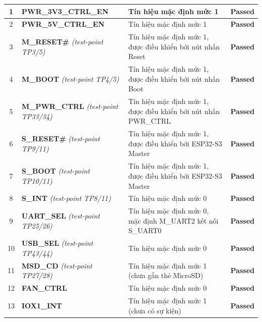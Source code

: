 \begin{longtable}{|c|p{}|p{}|c|}
                    1 & \textbf{PWR\_3V3\_CTRL\_EN} & Tín hiệu mặc định mức 1 & \textcolor{modern_blue}{\textbf{Passed}} \\ \hline
                    2 & \textbf{PWR\_5V\_CTRL\_EN} & Tín hiệu mặc định mức 1 & \textcolor{modern_blue}{\textbf{Passed}} \\ \hline
                    3 & \textbf{M\_RESET\#} \newline \textit{(test-point TP3/5)} & Tín hiệu mặc định mức 1, được điều khiển bởi nút nhấn Reset & \textcolor{modern_blue}{\textbf{Passed}} \\ \hline
                    4 & \textbf{M\_BOOT} \newline \textit{(test-point TP4/5)} & Tín hiệu mặc định mức 1, được điều khiển bởi nút nhấn Boot & \textcolor{modern_blue}{\textbf{Passed}} \\ \hline
                    5 & \textbf{M\_PWR\_CTRL} \newline \textit{(test-point TP33/34)} & Tín hiệu mặc định mức 1, được điều khiển bởi nút nhấn PWR\_CTRL & \textcolor{modern_blue}{\textbf{Passed}} \\ \hline
                    6 & \textbf{S\_RESET\#} \newline \textit{(test-point TP9/11)} & Tín hiệu mặc định mức 1, được điều khiển bởi ESP32-S3 Master & \textcolor{modern_blue}{\textbf{Passed}} \\ \hline
                    7 & \textbf{S\_BOOT} \newline \textit{(test-point TP10/11)} & Tín hiệu mặc định mức 1, được điều khiển bởi ESP32-S3 Master & \textcolor{modern_blue}{\textbf{Passed}} \\ \hline
                    8 & \textbf{S\_INT} \newline \textit{(test-point TP8/11)} & Tín hiệu mặc định mức 0 & \textcolor{modern_blue}{\textbf{Passed}} \\ \hline
                    9 & \textbf{UART\_SEL} \newline \textit{(test-point TP25/26)} & Tín hiệu mặc định mức 0, mặc định M\_UART2 kết nối S\_UART0 & \textcolor{modern_blue}{\textbf{Passed}} \\ \hline
                    10 & \textbf{USB\_SEL} \newline \textit{(test-point TP43/44)} & Tín hiệu mặc định mức 0 & \textcolor{modern_blue}{\textbf{Passed}} \\ \hline
                    11 & \textbf{MSD\_CD} \newline \textit{(test-point TP27/28)} & Tín hiệu mặc định mức 1 (chưa gắn thẻ MicroSD) & \textcolor{modern_blue}{\textbf{Passed}} \\ \hline
                    12 & \textbf{FAN\_CTRL} & Tín hiệu mặc định mức 0 & \textcolor{modern_blue}{\textbf{Passed}} \\ \hline
                    13 & \textbf{IOX1\_INT} & Tín hiệu mặc định mức 1 (chưa có sự kiện) & \textcolor{modern_blue}{\textbf{Passed}} \\ \hline
                
                \end{longtable}
        
